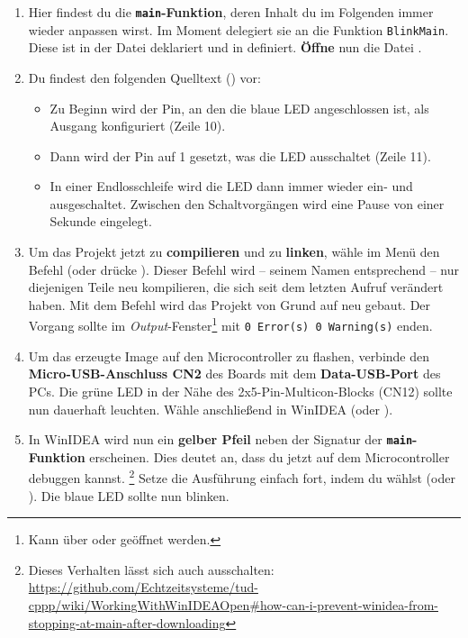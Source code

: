 \begin{enumerate}
\item
Hier findest du die \textbf{\lstinline|main|-Funktion}, deren Inhalt du im Folgenden immer wieder anpassen wirst.
Im Moment delegiert sie an die Funktion \lstinline|BlinkMain|.
Diese ist in der Datei  deklariert und in  definiert.
\textbf{Öffne} nun die Datei \textbf{}.

\item 
Du findest den folgenden Quelltext () vor:

\begin{itemize}
\item 
Zu Beginn wird der Pin, an den die blaue LED angeschlossen ist, als Ausgang konfiguriert (Zeile 10).

\item
Dann wird der Pin auf 1 gesetzt, was die LED ausschaltet (Zeile 11).

\item 
In einer Endlosschleife wird die LED dann immer wieder ein- und ausgeschaltet. Zwischen den Schaltvorgängen wird eine Pause von einer Sekunde eingelegt.
\end{itemize}

\item 
Um das Projekt jetzt zu \textbf{compilieren} und zu \textbf{linken}, wähle im Menü  den Befehl  (oder drücke ).
Dieser Befehl wird -- seinem Namen entsprechend -- nur diejenigen Teile neu kompilieren, die sich seit dem letzten Aufruf verändert haben.
Mit dem Befehl  wird das Projekt von Grund auf neu gebaut.
Der Vorgang sollte im \emph{Output}-Fenster\footnote{Kann über  oder  geöffnet werden.} mit \texttt{0 Error(s)  0 Warning(s)} enden.

\item 
Um das erzeugte Image auf den Microcontroller zu flashen, verbinde den \textbf{Micro-USB-Anschluss CN2} des Boards mit dem \textbf{Data-USB-Port} des PCs.
Die grüne LED in der Nähe des 2x5-Pin-Multicon-Blocks (CN12) sollte nun dauerhaft leuchten.
Wähle anschließend in WinIDEA \textbf{} (oder ).


\item 
In WinIDEA wird nun ein \textbf{gelber Pfeil} neben der Signatur der \textbf{\lstinline|main|-Funktion} erscheinen.
Dies deutet an, dass du jetzt auf dem Microcontroller debuggen kannst.
\footnote{Dieses Verhalten lässt sich auch ausschalten: \url{https://github.com/Echtzeitsysteme/tud-cppp/wiki/WorkingWithWinIDEAOpen\#how-can-i-prevent-winidea-from-stopping-at-main-after-downloading}}
Setze die Ausführung einfach fort, indem du \textbf{} wählst (oder ).
Die blaue LED sollte nun blinken.


\end{enumerate}
